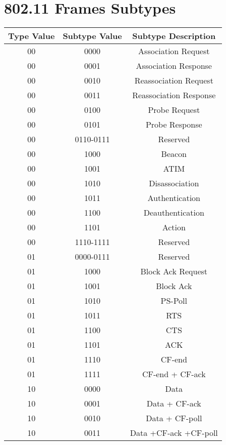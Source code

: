 \chapter{802.11 Frames Subtypes}
\label{app:frameSubtypes}

\begin{center}
\begin{longtable}{|c|c|c|}
\hline
\textbf{Type Value} & \textbf{Subtype Value} & \textbf{Subtype Description}   \\ \hline \hline
00 & 0000 & Association Request  \\  \hline
00 & 0001 & Association Response   \\  \hline
00 & 0010 & Reassociation Request   \\  \hline
00 & 0011 & Reassociation Response    \\  \hline
00 & 0100 & Probe Request    \\  \hline
00 & 0101 & Probe Response     \\  \hline
00 & 0110-0111 & Reserved  \\  \hline
00 & 1000 & Beacon \\  \hline
00 & 1001 & ATIM    \\  \hline
00 & 1010 & Disassociation     \\  \hline
00 & 1011 & Authentication     \\  \hline
00 & 1100 & Deauthentication     \\  \hline
00 & 1101 & Action     \\ \hline
00 & 1110-1111 & Reserved     \\  \hline
01 & 0000-0111 & Reserved    \\  \hline
01 & 1000 & Block Ack Request    \\  \hline
01 &1001 & Block Ack    \\  \hline
01 &1010 & PS-Poll    \\  \hline
01 &1011 & RTS     \\  \hline
01 &1100 & CTS     \\  \hline
01 &1101 & ACK     \\  \hline
01 &1110 & CF-end     \\  \hline
01 &1111 & CF-end + CF-ack    \\  \hline
10 & 0000 & Data   \\  \hline
10 & 0001 & Data + CF-ack    \\  \hline
10 & 0010 & Data + CF-poll    \\  \hline
10 & 0011 & Data +CF-ack +CF-poll     \\  \hline

\end{longtable}
\end{center}

